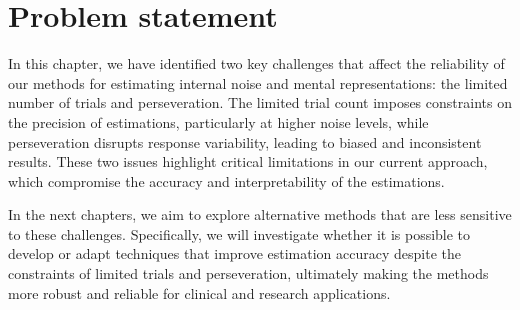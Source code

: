 \section {Problem statement} 
In this chapter, we have identified two key challenges that affect the reliability of our methods for estimating internal noise and mental representations: the limited number of trials and perseveration. The limited trial count imposes constraints on the precision of estimations, particularly at higher noise levels, while perseveration disrupts response variability, leading to biased and inconsistent results. These two issues highlight critical limitations in our current approach, which compromise the accuracy and interpretability of the estimations.

In the next chapters, we aim to explore alternative methods that are less sensitive to these challenges. Specifically, we will investigate whether it is possible to develop or adapt techniques that improve estimation accuracy despite the constraints of limited trials and perseveration, ultimately making the methods more robust and reliable for clinical and research applications.

